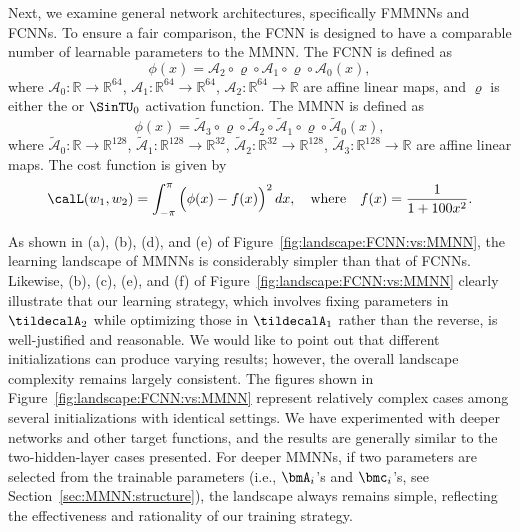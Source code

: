\documentclass[11pt,a4paper]{article}
\begin{document}
Next, we examine general network architectures, specifically FMMNNs and FCNNs.
To ensure a fair comparison, the FCNN is designed to have a comparable number of learnable parameters to the MMNN.
The FCNN is defined as
\begin{equation}\label{eq:FCNN:eg}
    \phi(x) = \mathcal{A}_2 \circ \varrho \circ {\mathcal{A}}_1 \circ \varrho \circ {\mathcal{A}}_0(x),
\end{equation}
where \({\mathcal{A}}_0: \mathbb{R} \to \mathbb{R}^{64}\), \({\mathcal{A}}_1: \mathbb{R}^{64} \to \mathbb{R}^{64}\),   \(\mathcal{A}_2: \mathbb{R}^{64} \to \mathbb{R}\) are affine linear maps, and $\varrho$ is either the \sine{} or $\SinTU_0$ activation function.
The MMNN is defined as
\begin{equation}\label{eq:MMNN:eg}
    \phi(x) = \tilde{\mathcal{A}}_3 \circ \varrho \circ {\tilde{\mathcal{A}}}_2 \circ {\tilde{\mathcal{A}}}_1 \circ \varrho \circ {\tilde{\mathcal{A}}}_0(x),
\end{equation}
where \({\tilde{\mathcal{A}}}_0: \mathbb{R} \to \mathbb{R}^{128}\), \({\tilde{\mathcal{A}}}_1: \mathbb{R}^{128} \to \mathbb{R}^{32}\), \({\tilde{\mathcal{A}}}_2: \mathbb{R}^{32} \to \mathbb{R}^{128}\),  \(\tilde{\mathcal{A}}_3: \mathbb{R}^{128} \to \mathbb{R}\) are affine linear maps.
The cost function is given by
\begin{equation*}
    \calL(w_1,w_2)=\int_{-\pi}^{\pi} \Big(\phi(x)- f(x)\Big)^2 \, dx,\quad \tn{where}\quad 
    f(x)=\frac{1}{1+100x^2}.
\end{equation*}

As shown in (a), (b), (d), and (e) of Figure~\ref{fig:landscape:FCNN:vs:MMNN}, the learning landscape of MMNNs is considerably simpler than that of FCNNs. Likewise, (b), (c), (e), and (f) of Figure~\ref{fig:landscape:FCNN:vs:MMNN} clearly illustrate that our learning strategy, which involves fixing parameters in $\tildecalA_2$ while optimizing those in $\tildecalA_1$ rather than the reverse, is well-justified and reasonable. We would like to point out that
different initializations can produce varying results; however, the overall landscape complexity remains largely consistent. The figures shown in Figure~\ref{fig:landscape:FCNN:vs:MMNN} represent relatively complex cases among several initializations with identical settings.
 We have experimented with deeper networks and other target functions, and the results are generally similar to the two-hidden-layer cases presented.
 For deeper MMNNs, if two parameters are selected from the trainable parameters (i.e., \( \bmA_i \)'s and \( \bmc_i \)'s, see Section~\ref{sec:MMNN:structure}), the landscape always remains simple, reflecting the effectiveness and rationality of our training strategy.
\end{document}
